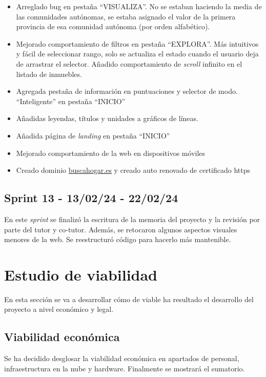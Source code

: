 \begin{itemize}
    \item Arreglado bug en pestaña ``VISUALIZA''. No se estaban haciendo la media de las comunidades autónomas, se estaba asignado el valor de la primera provincia de esa comunidad autónoma (por orden alfabético).
    \item Mejorado comportamiento de filtros en pestaña ``EXPLORA''. Más intuitivos y fácil de seleccionar rango, solo se actualiza el estado cuando el usuario deja de arrastrar el selector. Añadido comportamiento de \textit{scroll} infinito en el listado de inmuebles.
     \item Agregada pestaña de información en puntuaciones y selector de modo. ``Inteligente'' en pestaña ``INICIO''
     \item Añadidas leyendas, títulos y unidades a gráficos de líneas.
     \item Añadida página de \textit{landing} en pestaña ``INICIO''
     \item Mejorado comportamiento de la web en dispositivos móviles
     \item Creado dominio \href{https://www.buscahogar.es}{buscahogar.es} y creado auto renovado de certificado https
\end{itemize}

\subsection{Sprint 13 -  13/02/24 - 22/02/24}

En este \textit{sprint} se finalizó la escritura de la memoria del proyecto y la revisión por parte del tutor y co-tutor. Además, se retocaron algunos aspectos visuales menores de la web. Se reestructuró código para hacerlo más mantenible.

\clearpage
\section{Estudio de viabilidad}

En esta sección se va a desarrollar cómo de viable ha resultado el desarrollo del proyecto a nivel económico y legal. 

\subsection{Viabilidad económica}

Se ha decidido desglosar la viabilidad económica en apartados de personal, infraestructura en la nube y hardware. Finalmente se mostrará el sumatorio.

